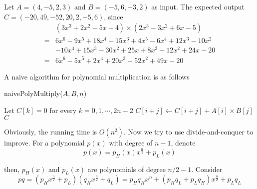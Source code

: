                 \begin{example}
                    Let $A = (4, -5, 2, 3)$ and $B = (-5, 6, -3, 2)$ as input. The expected output $C = (-20, 49, -52, 20, 2, -5, 6)$, since
                    \begin{align*}
                        &(3 x^3 + 2 x^2 - 5 x + 4) \times (2 x^3 - 3 x^2 + 6x - 5)\\
                       =& 6 x^6 - 9 x^5 + 18 x^4 - 15 x^3 + 4 x^5 - 6x^4 + 12x^3 - 10 x^2\\
                        & -10 x^4 + 15 x^3 - 30 x^2 + 25 x + 8 x^3 - 12 x^2 + 24 x - 20\\
                       =& 6 x^6 - 5 x^5 + 2x^4 + 20x^3 - 52 x^2 + 49 x - 20
                    \end{align*}
                \end{example}

                A naive algorithm for polynomial multiplication is as follows
                \begin{algorithm}[H]
                    \caption{naivePolyMultiply($A, B, n$)}
                    \begin{algorithmic}[1]
                        \State Let $C[k] = 0$ for every $k = 0, 1, \cdots, 2n - 2$
                                \State $C[i + j] \gets C[i + j] + A[i] \times B[j]$
                            \EndFor
                        \EndFor
                        \State \Return $C$
                    \end{algorithmic}
                \end{algorithm}

                Obviously, the running time is $O(n^2)$. Now we try to use divide-and-conquer to improve. For a polynomial $p(x)$ with degree of $n - 1$, denote
                \begin{equation*}
                    p(x) = p_H(x) x^{\frac{n}{2}} + p_L(x)
                \end{equation*}

                then, $p_H(x)$ and $p_L(x)$ are polynomials of degree $n/2 - 1$. Consider
                \begin{equation*}
                    pq = (p_H x^{\frac{n}{2}} + p_L)(q_H x^{\frac{n}{2}} + q_L) = p_Hq_Hx^n + (p_Hq_L + p_Lq_H)x^{\frac{n}{2}} + p_Lq_L
                \end{equation*}

